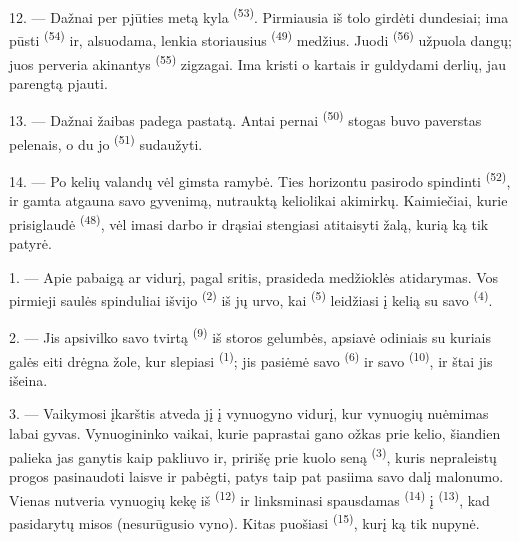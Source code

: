 \VUsaut{5.0mm}
\VUsaut{3.4mm}

12. --- Dažnai per pjūties metą kyla  \textsuperscript{(53)}.
Pirmiausia iš tolo girdėti  dundesiai; ima pūsti  \textsuperscript{(54)} ir, alsuodama, lenkia storiausius 
\textsuperscript{(49)} medžius. Juodi  \textsuperscript{(56)} užpuola
dangų; juos perveria akinantys  \textsuperscript{(55)} zigzagai. Ima
kristi  o kartais ir  guldydami derlių, jau parengtą
pjauti.

13. --- Dažnai žaibas padega pastatą. Antai pernai 
\textsuperscript{(50)} stogas buvo paverstas pelenais, o du jo 
\textsuperscript{(51)} sudaužyti.

14. --- Po kelių valandų vėl gimsta ramybė. Ties horizontu pasirodo spindinti
 \textsuperscript{(52)}, ir gamta atgauna savo gyvenimą,
nutrauktą keliolikai akimirkų. Kaimiečiai, kurie prisiglaudė 
\textsuperscript{(48)}, vėl imasi darbo ir drąsiai stengiasi atitaisyti žalą, kurią ką
tik patyrė.

\VUsaut{6.0mm}
\VUsaut{3.6mm}

\VUsaut{1.4mm}
\VUsaut{4.0mm}

1. --- Apie  pabaigą ar  vidurį, pagal sritis,
prasideda medžioklės atidarymas. Vos pirmieji saulės spinduliai išvijo
 \textsuperscript{(2)} iš jų urvo, kai 
\textsuperscript{(5)} leidžiasi į kelią su savo 
\textsuperscript{(4)}.

2. --- Jis apsivilko savo tvirtą  \textsuperscript{(9)} iš
storos gelumbės, apsiavė odiniais  su kuriais galės eiti
drėgna žole, kur slepiasi  \textsuperscript{(1)}; jis pasiėmė savo
 \textsuperscript{(6)} ir savo 
\textsuperscript{(10)}, ir štai jis išeina.

3. --- Vaikymosi įkarštis atveda jį į vynuogyno vidurį, kur vynuogių nuėmimas labai
gyvas. Vynuogininko vaikai, kurie paprastai gano ožkas prie kelio, šiandien palieka
jas ganytis kaip pakliuvo ir, pririšę prie kuolo seną  \textsuperscript{(3)},
kuris nepraleistų progos pasinaudoti laisve ir pabėgti, patys taip pat pasiima savo
dalį malonumo. Vienas nutveria vynuogių kekę iš 
\textsuperscript{(12)} ir linksminasi spausdamas  \textsuperscript{(14)}
į  \textsuperscript{(13)}, kad pasidarytų misos (nesurūgusio vyno). Kitas
puošiasi  \textsuperscript{(15)}, kurį ką tik nupynė.

